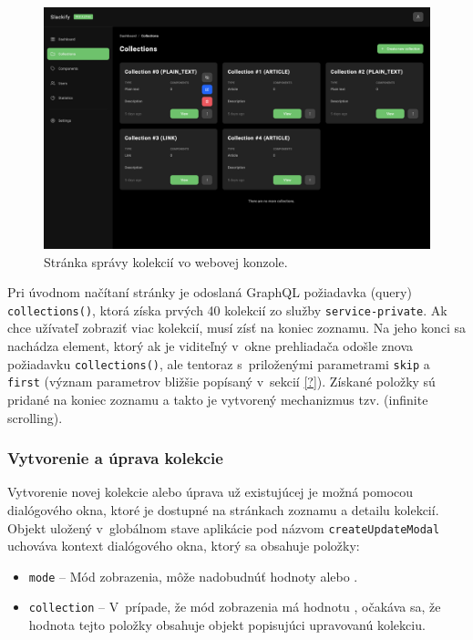 \begin{figure}[h]
	\centering
	\includegraphics[scale=0.085]{obrazky-figures/screenshot_collections}
	\caption{Stránka správy kolekcií vo webovej konzole.}
\end{figure}

\noindent Pri úvodnom načítaní stránky je odoslaná GraphQL požiadavka (query) \texttt{collections()}, ktorá získa prvých 40 kolekcií zo služby \texttt{service-private}. Ak chce užívateľ zobraziť viac kolekcií, musí zísť na koniec zoznamu. Na jeho konci sa nachádza element, ktorý ak je viditeľný v~okne prehliadača odošle znova požiadavku \texttt{collections()}, ale tentoraz s~priloženými parametrami \texttt{skip} a \texttt{first} (význam parametrov bližšie popísaný v~sekcií \ref{?}). Získané položky sú pridané na koniec zoznamu a takto je vytvorený mechanizmus tzv.  (infinite scrolling).

\subsubsection{Vytvorenie a úprava kolekcie}
Vytvorenie novej kolekcie alebo úprava už existujúcej je možná pomocou dialógového okna, ktoré je dostupné na stránkach zoznamu a detailu kolekcií. Objekt uložený v~globálnom stave aplikácie pod názvom \texttt{createUpdateModal} uchováva kontext dialógového okna, ktorý sa obsahuje položky:

\begin{itemize}
	\item \texttt{mode} -- Mód zobrazenia, môže nadobudnúť hodnoty  alebo .
	\item \texttt{collection} -- V~prípade, že mód zobrazenia má hodnotu , očakáva sa, že hodnota tejto položky obsahuje objekt popisujúci upravovanú kolekciu.
\end{itemize}

